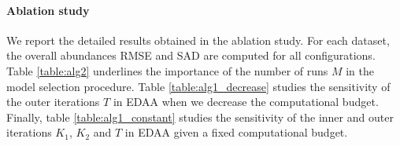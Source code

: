 \paragraph{Ablation study}

We report the detailed results obtained in the ablation study.
For each dataset, the overall abundances RMSE and SAD are computed for all configurations.
Table \ref{table:alg2} underlines the importance of the number of runs
$M$ in the model selection procedure.
Table \ref{table:alg1_decrease} studies the sensitivity of the outer iterations $T$ in EDAA when we decrease the computational budget.
Finally, table \ref{table:alg1_constant} studies the sensitivity of the inner and outer
iterations $K_1$, $K_2$ and $T$ in EDAA given a fixed computational budget.

\begin{table}[h]
\centering
    
  \label{table:alg1_decrease}
\end{table}

\begin{table}[h]
    
  \label{table:alg2}
\end{table}

\begin{table}[h]
  \begin{adjustbox}{width=\textwidth}
    
  \end{adjustbox}
  \label{table:alg1_constant}
\end{table}



